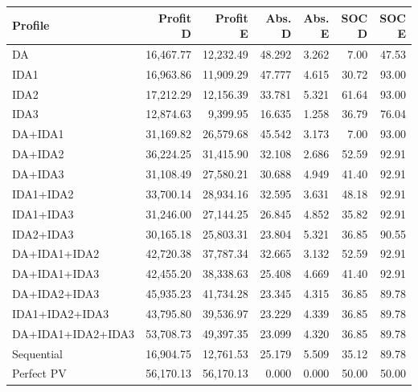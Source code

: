 \begingroup\small
\begin{longtable}{lrrrrrr}
\toprule
Profile & Profit D & Profit E & Abs. D & Abs. E & SOC D & SOC E\\
\midrule\endhead
DA & 16,467.77 & 12,232.49 & 48.292 & 3.262 & 7.00 & 47.53\\
IDA1 & 16,963.86 & 11,909.29 & 47.777 & 4.615 & 30.72 & 93.00\\
IDA2 & 17,212.29 & 12,156.39 & 33.781 & 5.321 & 61.64 & 93.00\\
IDA3 & 12,874.63 & 9,399.95 & 16.635 & 1.258 & 36.79 & 76.04\\
DA+IDA1 & 31,169.82 & 26,579.68 & 45.542 & 3.173 & 7.00 & 93.00\\
DA+IDA2 & 36,224.25 & 31,415.90 & 32.108 & 2.686 & 52.59 & 92.91\\
DA+IDA3 & 31,108.49 & 27,580.21 & 30.688 & 4.949 & 41.40 & 92.91\\
IDA1+IDA2 & 33,700.14 & 28,934.16 & 32.595 & 3.631 & 48.18 & 92.91\\
IDA1+IDA3 & 31,246.00 & 27,144.25 & 26.845 & 4.852 & 35.82 & 92.91\\
IDA2+IDA3 & 30,165.18 & 25,803.31 & 23.804 & 5.321 & 36.85 & 90.55\\
DA+IDA1+IDA2 & 42,720.38 & 37,787.34 & 32.665 & 3.132 & 52.59 & 92.91\\
DA+IDA1+IDA3 & 42,455.20 & 38,338.63 & 25.408 & 4.669 & 41.40 & 92.91\\
DA+IDA2+IDA3 & 45,935.23 & 41,734.28 & 23.345 & 4.315 & 36.85 & 89.78\\
IDA1+IDA2+IDA3 & 43,795.80 & 39,536.97 & 23.229 & 4.339 & 36.85 & 89.78\\
DA+IDA1+IDA2+IDA3 & 53,708.73 & 49,397.35 & 23.099 & 4.320 & 36.85 & 89.78\\
Sequential & 16,904.75 & 12,761.53 & 25.179 & 5.509 & 35.12 & 89.78\\
Perfect PV & 56,170.13 & 56,170.13 & 0.000 & 0.000 & 50.00 & 50.00\\
\bottomrule
\end{longtable}
\endgroup
